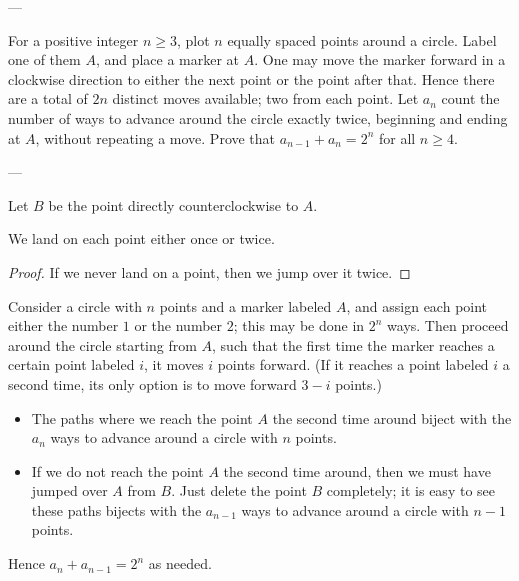 
---

For a positive integer $n\ge3$, plot $n$ equally spaced points around a circle. Label one of them $A$, and place a marker at $A$. One may move the marker forward in a clockwise direction to either the next point or the point after that. Hence there are a total of $2n$ distinct moves available; two from each point. Let $a_n$ count the number of ways to advance around the circle exactly twice, beginning and ending at $A$, without repeating a move. Prove that $a_{n-1}+a_n=2^n$ for all $n\ge4$.

---

Let $B$ be the point directly counterclockwise to $A$.
\begin{claim*}
    We land on each point either once or twice.
\end{claim*}
\begin{proof}
    If we never land on a point, then we jump over it twice.
\end{proof}

Consider a circle with $n$ points and a marker labeled $A$, and assign each point either the number $1$ or the number $2$; this may be done in $2^n$ ways. Then proceed around the circle starting from $A$, such that the first time the marker reaches a certain point labeled $i$, it moves $i$ points forward. (If it reaches a point labeled $i$ a second time, its only option is to move forward $3-i$ points.)
\begin{itemize}
    \item The paths where we reach the point $A$ the second time around biject with the $a_n$ ways to advance around a circle with $n$ points.
    \item If we do not reach the point $A$ the second time around, then we must have jumped over $A$ from $B$. Just delete the point $B$ completely; it is easy to see these paths bijects with the $a_{n-1}$ ways to advance around a circle with $n-1$ points.
\end{itemize}
Hence $a_n+a_{n-1}=2^n$ as needed.

